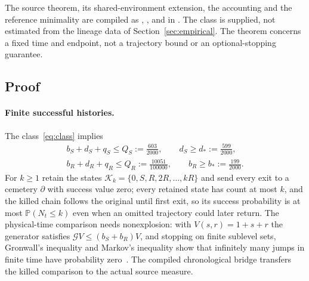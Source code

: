 \documentclass[11pt,a4paper]{article}
\theoremstyle{plain}
\theoremstyle{definition}
\theoremstyle{remark}
\newcommand{\PP}{\mathbb P}
\begin{document}
The source theorem, its shared-environment extension, the accounting and the reference minimality are compiled as , ,  and  in . The class is supplied, not estimated from the lineage data of Section~\ref{sec:empirical}. The theorem concerns a fixed time and endpoint, not a trajectory bound or an optional-stopping guarantee.

\subsection{Proof}
\paragraph{Finite successful histories.} The class~\eqref{eq:class} implies
\begin{equation}\label{eq:Q}
\begin{gathered}
b_S+d_S+q_S\le Q_S:=\tfrac{603}{2000},\qquad d_S\ge d_*:=\tfrac{599}{2000},\\
b_R+d_R+q_R\le Q_R:=\tfrac{10051}{100000},\qquad b_R\ge b_*:=\tfrac{199}{2000}.
\end{gathered}
\end{equation}
For $k\ge1$ retain the states $\mathcal K_k=\{0,S,R,2R,\dots,kR\}$ and send every exit to a cemetery $\partial$ with success value zero; every retained state has count at most $k$, and the killed chain follows the original until first exit, so its success probability is at most $\PP(N_t\le k)$ even when an omitted trajectory could later return. The physical-time comparison needs nonexplosion: with $V(s,r)=1+s+r$ the generator satisfies $\mathcal GV\le(b_S+b_R)V$, and stopping on finite sublevel sets, Gronwall's inequality and Markov's inequality show that infinitely many jumps in finite time have probability zero~\citep{norris1997}. The compiled chronological bridge transfers the killed comparison to the actual source measure.
\end{document}
